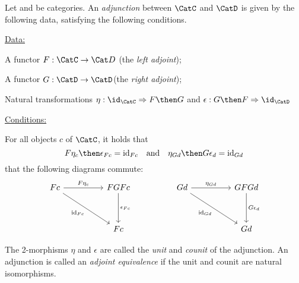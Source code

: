 \begin{ctdefinition}[]
    \label{def:cat-adjunction}
    Let \CatC and \CatD be categories. An \emph{adjunction} between $\CatC$ and $\CatD$ is given by the following data, satisfying the following conditions.

    \underline{Data:}
    \begin{compactenum}
        \item A functor $F:  \CatC \rightarrow \Cat D$ (the \emph{left adjoint});
        \item A functor $G: \CatD \rightarrow \CatD$(the \emph{right adjoint});
        \item Natural transformations $\eta : \id_\CatC \Rightarrow F \then G$ and $\epsilon : G \then F \Rightarrow \id_\CatD$
    \end{compactenum}

    \underline{Conditions:}
    \begin{compactenum}
        \item For all objects $c$ of $\CatC$, it holds that
        \[
            F\eta_c \then \epsilon_{Fc} = \text{id}_{Fc} \quad \text{and}  \quad  \eta_{Gd} \then G\epsilon_d = \text{id}_{Gd}
        \]
         that the following diagrams commute:
        \[\begin{tikzcd}
              Fc && FGFc && Gd && GFGd \\
              \\
              && Fc &&&& Gd
              \arrow["{F\eta_c}", from=1-1, to=1-3]
              \arrow["{\epsilon_{Fc}}", from=1-3, to=3-3]
              \arrow["{\text{id}_{Fc}}"', from=1-1, to=3-3]
              \arrow["{\text{id}_{Gd}}"', from=1-5, to=3-7]
              \arrow["{\eta_{Gd}}", from=1-5, to=1-7]
              \arrow["{G\epsilon_d}", from=1-7, to=3-7]
        \end{tikzcd}\]
    \end{compactenum}
    The 2-morphisms $\eta$ and $\epsilon$ are called the \emph{unit} and \emph{counit} of the adjunction.
    An adjunction is called an \emph{adjoint equivalence} if the unit and counit are natural isomorphisms.
\end{ctdefinition}






